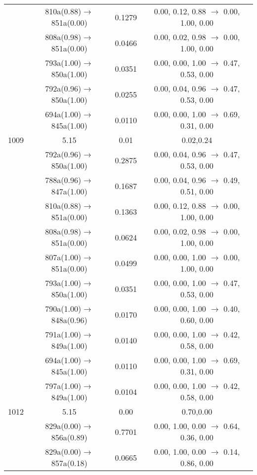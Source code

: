\documentclass[10pt,a4paper]{article}
\begin{document}
\begin{longtable}{c|c|c|c}
 	& 810a(0.88)$\rightarrow$851a(0.00) &	 0.1279 &	 0.00, 0.12, 0.88 $\rightarrow$ 0.00, 1.00, 0.00 \\ 
 	& 808a(0.98)$\rightarrow$851a(0.00) &	 0.0466 &	 0.00, 0.02, 0.98 $\rightarrow$ 0.00, 1.00, 0.00 \\ 
 	& 793a(1.00)$\rightarrow$850a(1.00) &	 0.0351 &	 0.00, 0.00, 1.00 $\rightarrow$ 0.47, 0.53, 0.00 \\ 
 	& 792a(0.96)$\rightarrow$850a(1.00) &	 0.0255 &	 0.00, 0.04, 0.96 $\rightarrow$ 0.47, 0.53, 0.00 \\ 
 	& 694a(1.00)$\rightarrow$845a(1.00) &	 0.0110 &	 0.00, 0.00, 1.00 $\rightarrow$ 0.69, 0.31, 0.00 \\ 
 \hline1009 &	 5.15 &	 0.01 &	 0.02,0.24 \\ 
  	& 792a(0.96)$\rightarrow$850a(1.00) &	 0.2875 &	 0.00, 0.04, 0.96 $\rightarrow$ 0.47, 0.53, 0.00 \\ 
 	& 788a(0.96)$\rightarrow$847a(1.00) &	 0.1687 &	 0.00, 0.04, 0.96 $\rightarrow$ 0.49, 0.51, 0.00 \\ 
 	& 810a(0.88)$\rightarrow$851a(0.00) &	 0.1363 &	 0.00, 0.12, 0.88 $\rightarrow$ 0.00, 1.00, 0.00 \\ 
 	& 808a(0.98)$\rightarrow$851a(0.00) &	 0.0624 &	 0.00, 0.02, 0.98 $\rightarrow$ 0.00, 1.00, 0.00 \\ 
 	& 807a(1.00)$\rightarrow$851a(0.00) &	 0.0499 &	 0.00, 0.00, 1.00 $\rightarrow$ 0.00, 1.00, 0.00 \\ 
 	& 793a(1.00)$\rightarrow$850a(1.00) &	 0.0351 &	 0.00, 0.00, 1.00 $\rightarrow$ 0.47, 0.53, 0.00 \\ 
 	& 790a(1.00)$\rightarrow$848a(0.96) &	 0.0170 &	 0.00, 0.00, 1.00 $\rightarrow$ 0.40, 0.60, 0.00 \\ 
 	& 791a(1.00)$\rightarrow$849a(1.00) &	 0.0140 &	 0.00, 0.00, 1.00 $\rightarrow$ 0.42, 0.58, 0.00 \\ 
 	& 694a(1.00)$\rightarrow$845a(1.00) &	 0.0110 &	 0.00, 0.00, 1.00 $\rightarrow$ 0.69, 0.31, 0.00 \\ 
 	& 797a(1.00)$\rightarrow$849a(1.00) &	 0.0104 &	 0.00, 0.00, 1.00 $\rightarrow$ 0.42, 0.58, 0.00 \\ 
 \hline1012 &	 5.15 &	 0.00 &	 0.70,0.00 \\ 
  	& 829a(0.00)$\rightarrow$856a(0.89) &	 0.7701 &	 0.00, 1.00, 0.00 $\rightarrow$ 0.64, 0.36, 0.00 \\ 
 	& 829a(0.00)$\rightarrow$857a(0.18) &	 0.0665 &	 0.00, 1.00, 0.00 $\rightarrow$ 0.14, 0.86, 0.00 \\ 

\end{longtable}
\end{document}
